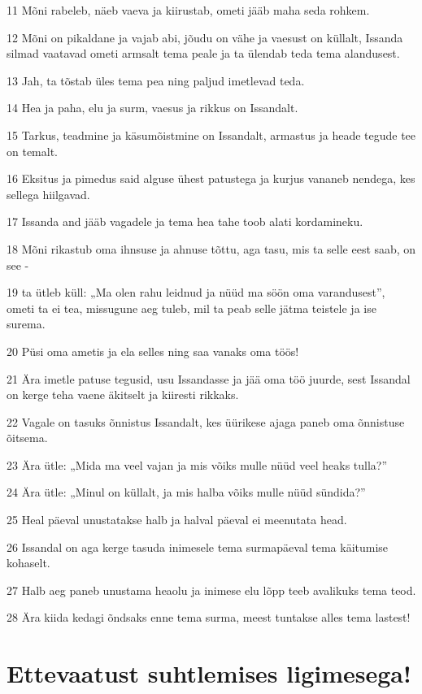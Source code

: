 \par 11 Mõni rabeleb, näeb vaeva ja kiirustab, ometi jääb maha seda rohkem.
\par 12 Mõni on pikaldane ja vajab abi, jõudu on vähe ja vaesust on küllalt, Issanda silmad vaatavad ometi armsalt tema peale ja ta ülendab teda tema alandusest.
\par 13 Jah, ta tõstab üles tema pea ning paljud imetlevad teda.
\par 14 Hea ja paha, elu ja surm, vaesus ja rikkus on Issandalt.
\par 15 Tarkus, teadmine ja käsumõistmine on Issandalt, armastus ja heade tegude tee on temalt.
\par 16 Eksitus ja pimedus said alguse ühest patustega ja kurjus vananeb nendega, kes sellega hiilgavad.
\par 17 Issanda and jääb vagadele ja tema hea tahe toob alati kordamineku.
\par 18 Mõni rikastub oma ihnsuse ja ahnuse tõttu, aga tasu, mis ta selle eest saab, on see -
\par 19 ta ütleb küll: „Ma olen rahu leidnud ja nüüd ma söön oma varandusest”, ometi ta ei tea, missugune aeg tuleb, mil ta peab selle jätma teistele ja ise surema.
\par 20 Püsi oma ametis ja ela selles ning saa vanaks oma töös!
\par 21 Ära imetle patuse tegusid, usu Issandasse ja jää oma töö juurde, sest Issandal on kerge teha vaene äkitselt ja kiiresti rikkaks.
\par 22 Vagale on tasuks õnnistus Issandalt, kes üürikese ajaga paneb oma õnnistuse õitsema.
\par 23 Ära ütle: „Mida ma veel vajan ja mis võiks mulle nüüd veel heaks tulla?”
\par 24 Ära ütle: „Minul on küllalt, ja mis halba võiks mulle nüüd sündida?”
\par 25 Heal päeval unustatakse halb ja halval päeval ei meenutata head.
\par 26 Issandal on aga kerge tasuda inimesele tema surmapäeval tema käitumise kohaselt.
\par 27 Halb aeg paneb unustama heaolu ja inimese elu lõpp teeb avalikuks tema teod.
\par 28 Ära kiida kedagi õndsaks enne tema surma, meest tuntakse alles tema lastest!

\section*{Ettevaatust suhtlemises ligimesega!}

